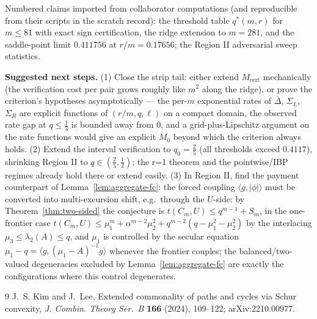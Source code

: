 \documentclass[11pt]{article}
\newcommand{\ip}[2]{\langle #1,#2\rangle}
\begin{document}
Numbered claims imported from collaborator computations (and reproducible from their scripts in the scratch record): the threshold table $q^*(m,r)$ for $m\le81$ with exact sign certification, the ridge extension to $m=281$, and the saddle-point limit $0.411756$ at $r/m=0.17656$; the Region II adversarial sweep statistics.

\medskip
\noindent\textbf{Suggested next steps.}
(1) Close the strip tail: either extend $M_{\mathrm{cert}}$ mechanically (the verification cost per pair grows roughly like $m^2$ along the ridge), or prove the criterion's hypotheses asymptotically --- the per-$m$ exponential rates of $\bar\Delta$, $\Sigma_L$, $\Sigma_R$ are explicit functions of $(r/m,q,\ell)$ on a compact domain, the observed rate gap at $q\le\tfrac13$ is bounded away from $0$, and a grid-plus-Lipschitz argument on the rate functions would give an explicit $M_0$ beyond which the criterion always holds.  (2) Extend the interval verification to $q_0=\tfrac25$ (all thresholds exceed $0.4117$), shrinking Region II to $q\in(\tfrac25,\tfrac12)$; the r=1 theorem and the pointwise/IBP regimes already hold there or extend easily.  (3) In Region II, find the payment counterpart of Lemma~\ref{lem:aggregate-fc}: the forced coupling $\ip{g}{|\phi|}$ must be converted into multi-excursion shift, e.g.\ through the $U$-side: by Theorem~\ref{thm:two-sided} the conjecture is $t(C_m,U)\le q^{m-1}+S_m$, in the one-frontier case $t(C_m,U)\le\mu_1^m+\alpha^{m-2}\mu_2^2+q^{m-2}(q-\mu_1^2-\mu_2^2)$ by the interlacing $\mu_3\le\lambda_2(A)\le q$, and $\mu_1$ is controlled by the secular equation $\mu_1-q=\ip{g}{(\mu_1-A)^{-1}g}$ whenever the frontier couples; the balanced/two-valued degeneracies excluded by Lemma~\ref{lem:aggregate-fc} are exactly the configurations where this control degenerates.

\begin{thebibliography}{9}
J.~S. Kim and J.~Lee,
\newblock Extended commonality of paths and cycles via Schur convexity,
\newblock \emph{J. Combin. Theory Ser.~B} \textbf{166} (2024), 109--122; arXiv:2210.00977.
\end{thebibliography}
\end{document}
